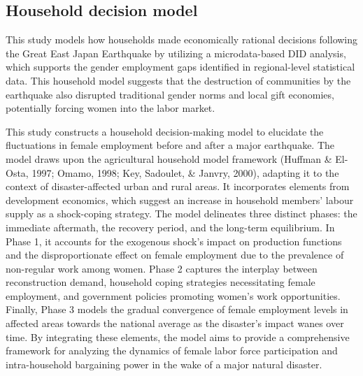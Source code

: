 \documentclass[12pt,halfline,a4paper]{ouparticle}
\begin{document}
\subsection{Household decision model}
\label{sec5.1}

This study models how households made economically rational decisions following the Great East Japan Earthquake by utilizing a microdata-based DID analysis, which supports the gender employment gaps identified in regional-level statistical data. This household model suggests that the destruction of communities by the earthquake also disrupted traditional gender norms and local gift economies, potentially forcing women into the labor market.


This study constructs a household decision-making model to elucidate the fluctuations in female employment before and after a major earthquake. The model draws upon the agricultural household model framework (Huffman \& El-Osta, 1997; Omamo, 1998; Key, Sadoulet, \& Janvry, 2000), adapting it to the context of disaster-affected urban and rural areas. It incorporates elements from development economics, which suggest an increase in household members' labour supply as a shock-coping strategy.
The model delineates three distinct phases: the immediate aftermath, the recovery period, and the long-term equilibrium. In Phase 1, it accounts for the exogenous shock's impact on production functions and the disproportionate effect on female employment due to the prevalence of non-regular work among women. Phase 2 captures the interplay between reconstruction demand, household coping strategies necessitating female employment, and government policies promoting women's work opportunities. Finally, Phase 3 models the gradual convergence of female employment levels in affected areas towards the national average as the disaster's impact wanes over time.
By integrating these elements, the model aims to provide a comprehensive framework for analyzing the dynamics of female labor force participation and intra-household bargaining power in the wake of a major natural disaster.



\nocite{*}

\end{document}

